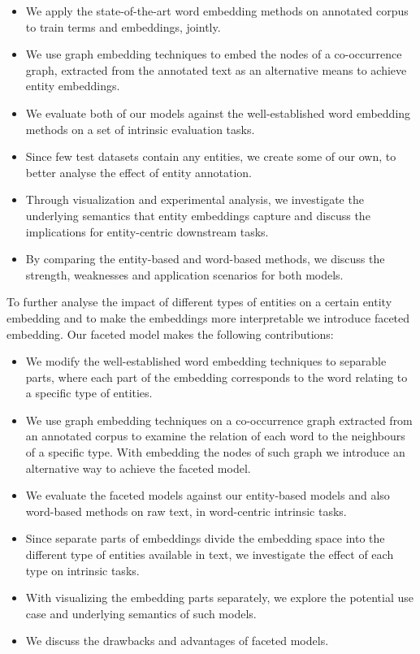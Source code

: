 \begin{itemize}
\item We apply the state-of-the-art word embedding methods on annotated corpus to train terms and embeddings, jointly. 
\item We use graph embedding techniques to embed the nodes of a co-occurrence graph, extracted from the annotated text as an alternative means to achieve entity embeddings. 
\item We evaluate both of our models against the well-established word embedding methods on a set of intrinsic evaluation tasks. 
\item Since few test datasets contain any entities, we create some of our own, to better analyse the effect of entity annotation. 
\item Through visualization and experimental analysis, we investigate the underlying semantics that entity embeddings capture and discuss the implications for entity-centric downstream tasks.
\item By comparing the entity-based and word-based methods, we discuss the strength, weaknesses and application scenarios for both models.
\end{itemize}
To further analyse the impact of different types of entities on a certain entity embedding and to make the embeddings more interpretable we introduce faceted embedding. Our faceted model makes the following contributions: 
\begin{itemize}
\item We modify the well-established word embedding techniques to separable parts, where each part of the embedding corresponds to the word relating to a specific type of entities. 
\item We use graph embedding techniques on a co-occurrence graph extracted from an annotated corpus to examine the relation of each word to the neighbours of a specific type. With embedding the nodes of such graph we introduce an alternative way to achieve the faceted model. 
\item We evaluate the faceted models against our entity-based models and also word-based methods on raw text, in word-centric intrinsic tasks. 
\item Since separate parts of embeddings divide the embedding space into the different type of entities available in text, we investigate the effect of each type on intrinsic tasks. 
\item With visualizing the embedding parts separately, we explore the potential use case and underlying semantics of such models. 
\item We discuss the drawbacks and advantages of faceted models. 
  
\end{itemize}

